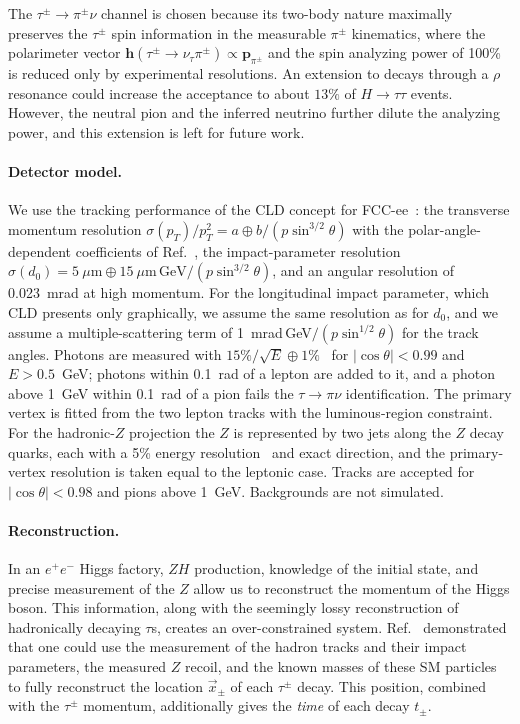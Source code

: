 \documentclass[%
 reprint,
 amsmath,amssymb,
 aps
]{revtex4-2}
\begin{document}
The $\tau^\pm\rightarrow\pi^{\pm}\nu$ channel is chosen because its two-body nature maximally preserves the $\tau^\pm$ spin information in the measurable $\pi^\pm$ kinematics, where the polarimeter vector $\mathbf{h}(\tau^{\pm} \to \nu_{\tau}\pi^{\pm}) \propto \mathbf{p}_{\pi^{{\pm}}}$ and the spin analyzing power of 100\% is reduced only by experimental resolutions. An extension to decays through a $\rho$ resonance could increase the acceptance to about $13\%$ of $H\rightarrow\tau\tau$ events. However, the neutral pion and the inferred neutrino further dilute the analyzing power, and this extension is left for future work.

\paragraph{Detector model.} We use the tracking performance of the CLD concept for FCC-ee~\cite{Bacchetta:2019fmz}: the transverse momentum resolution $\sigma(p_T)/p_T^2=a\oplus b/(p\sin^{3/2}\theta)$ with the polar-angle-dependent coefficients of Ref.~\cite{Bacchetta:2019fmz}, the impact-parameter resolution $\sigma(d_0)=5~\mu\mathrm{m}\oplus 15~\mu\mathrm{m\,GeV}/(p\sin^{3/2}\theta)$, and an angular resolution of 0.023~mrad at high momentum. For the longitudinal impact parameter, which CLD presents only graphically, we assume the same resolution as for $d_0$, and we assume a multiple-scattering term of 1~mrad\,GeV$/(p\sin^{1/2}\theta)$ for the track angles. Photons are measured with $15\%/\sqrt{E}\oplus1\%$~\cite{FCC:2025lpp,Bacchetta:2019fmz} for $|\cos\theta|<0.99$ and $E>0.5$~GeV; photons within 0.1~rad of a lepton are added to it, and a photon above 1~GeV within 0.1~rad of a pion fails the $\tau\to\pi\nu$ identification. The primary vertex is fitted from the two lepton tracks with the luminous-region constraint. For the hadronic-$Z$ projection the $Z$ is represented by two jets along the $Z$ decay quarks, each with a 5\% energy resolution~\cite{Bacchetta:2019fmz} and exact direction, and the primary-vertex resolution is taken equal to the leptonic case. Tracks are accepted for $|\cos\theta|<0.98$ and pions above 1~GeV. Backgrounds are not simulated.

\paragraph{Reconstruction.} In an $e^+e^-$ Higgs factory, $ZH$ production, knowledge of the initial state, and precise measurement of the $Z$ allow us to reconstruct the momentum of the Higgs boson. This information, along with the seemingly lossy reconstruction of hadronically decaying $\tau$s, creates an over-constrained system. Ref.~\cite{Jeans_2016} demonstrated that one could use the measurement of the hadron tracks and their impact parameters, the measured $Z$ recoil, and the known masses of these SM particles to fully reconstruct the location $\vec{x}_\pm$ of each $\tau^\pm$ decay. This position, combined with the $\tau^\pm$ momentum, additionally gives the \emph{time} of each decay $t_\pm$.
\end{document}
